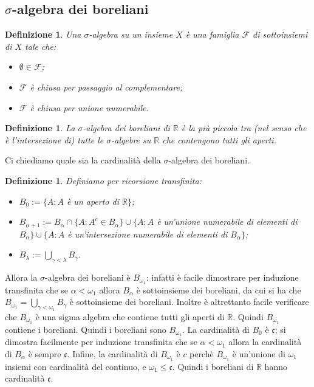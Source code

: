 \documentclass[a4paper,10pt,oneside]{article}
\theoremstyle{plain}
\newtheorem{mydef}[mytheorem]{Definizione}
\theoremstyle{definition}
\theoremstyle{remark}
\begin{document}
\subsection{$\sigma$-algebra dei boreliani}

\begin{mydef}
Una $\sigma$-algebra su un insieme $X$ è una famiglia $\mathcal F$ di sottoinsiemi di $X$ tale che:
\begin{itemize}
 \item $\emptyset\in\mathcal F$;
 \item $\mathcal F$ è chiusa per passaggio al complementare;
 \item $\mathcal F$ è chiusa per unione numerabile.
\end{itemize}
\end{mydef}

\begin{mydef}
La $\sigma$-algebra dei boreliani di $\mathbb R$ è la più piccola tra (nel senso che è l'intersezione di) tutte le $\sigma$-algebre su $\mathbb R$ che contengono tutti gli aperti.
\end{mydef}

Ci chiediamo quale sia la cardinalità della $\sigma$-algebra dei boreliani.

\begin{mydef}
Definiamo per ricorsione transfinita:
\begin{itemize}
 \item $B_0:=\{A : A$ è un aperto di $\mathbb R\}$;
 \item $B_{\alpha+1}:=B_\alpha\cap\{A : A^c\in B_\alpha\}\cup\{A : A$ è un'unione numerabile di elementi di $B_\alpha\}\cup\{A : A$ è un'intersezione numerabile di elementi di $B_\alpha\}$;
 \item $B_\lambda:=\bigcup\limits_{\gamma<\lambda}B_\gamma$.
\end{itemize}
\end{mydef}
Allora la $\sigma$-algebra dei boreliani è $B_{\omega_1}$: infatti è facile dimostrare per induzione transfinita che se $\alpha<\omega_1$ allora $B_\alpha$ è sottoinsieme dei boreliani, da cui si ha che $B_{\omega_1}=\bigcup\limits_{\gamma<\omega_1}B_\gamma$ è sottoinsieme dei boreliani. Inoltre è altrettanto facile verificare che $B_{\omega_1}$ è una sigma algebra che contiene tutti gli aperti di $\mathbb R$. Quindi $B_{\omega_1}$ contiene i boreliani. Quindi i boreliani sono $B_{\omega_1}$.
La cardinalità di $B_0$ è $\mathfrak c$; si dimostra facilmente per induzione transfinita che se $\alpha<\omega_1$ allora la cardinalità  di $B_\alpha$ è sempre $\mathfrak c$. Infine, la cardinalità di $B_{\omega_1}$ è $c$ perchè $B_{\omega_1}$ è un'unione di $\omega_1$ insiemi con cardinalità del continuo, e $\omega_1\le \mathfrak c$.
Quindi i boreliani di $\mathbb R$ hanno cardinalità $\mathfrak c$.
\end{document}
